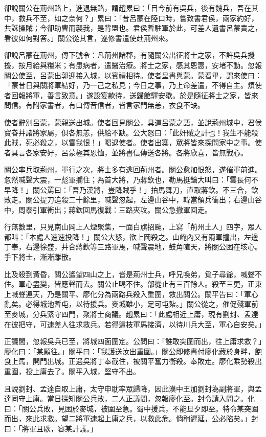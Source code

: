 卻說關公在荊州路上，進退無路，謂趙累曰：「目今前有吳兵，後有魏兵，吾在其中，救兵不至，如之奈何？」累曰：「昔呂蒙在陸口時，嘗致書君侯，兩家約好，共誅操賊；今卻助曹而襲我，是背盟也。君侯暫駐軍於此，可差人遺書呂蒙責之，看彼如何對答。」關公從其言，遂修書遣使赴荊州來。

卻說呂蒙在荊州，傳下號令：凡荊州諸郡，有隨關公出征將士之家，不許吳兵攪擾，按月給與糧米；有患病者，遣醫治療。將士之家，感其恩惠，安堵不動。忽報關公使至，呂蒙出郭迎接入城，以賓禮相待。使者呈書與蒙。蒙看畢，謂來使曰：「蒙昔日與關將軍結好，乃一己之私見；今日之事，乃上命差遣，不得自主。煩使者回報將軍，善言致意。」遂設宴款待，送歸館驛安歇。於是隨征將士之家，皆來問信。有附家書者，有口傳音信者，皆言家門無恙，衣食不缺。

使者辭別呂蒙，蒙親送出城。使者回見關公，具道呂蒙之語，並說荊州城中，君侯寶眷并諸將家屬，俱各無恙，供給不缺。公大怒曰：「此奸賊之計也！我生不能殺此賊，死必殺之，以雪我恨！」喝退使者。使者出寨，眾將皆來探問家中之事。使者具言各家安好，呂蒙極其恩恤，並將書信傳送各將。各將欣喜，皆無戰心。

關公率兵取荊州，軍行之次，將士多有逃回荊州者。關公愈加恨怒，遂催軍前進。忽然喊聲大震，一彪軍攔住；為首大將，乃蔣欽也，勒馬挺鎗大叫曰：「雲長何不早降！」關公罵曰：「吾乃漢將，豈降賊乎！」拍馬舞刀，直取蔣欽。不三合，欽敗走。關公提刀追殺二十餘里，喊聲忽起，左邊山谷中，韓當領兵衝出；右邊山谷中，周泰引軍衝出；蔣欽回馬復戰：三路夾攻。關公急撤軍回走。

行無數里，只見南山岡上人煙聚集，一面白旗招颭，上寫「荊州土人」四字，眾人都叫：「本處人速速投降！」關公大怒，欲上岡殺之。山崦內又有兩軍撞出，左邊丁奉，右邊徐盛，并合蔣欽等三路軍馬，喊聲震地，鼓角喧天，將關公困在垓心。手下將士，漸漸離散。

比及殺到黃昏，關公遙望四山之上，皆是荊州士兵，呼兄喚弟，覓子尋爺，喊聲不住。軍心盡變，皆應聲而去。關公止喝不住。部從止有三百餘人。殺至三更，正東上喊聲連天，乃是關平、廖化分為兩路兵殺入重圍，救出關公。關平告曰：「軍心亂矣。必得城池暫屯，以待援兵。麥城雖小，足可屯紮。」關公從之，催促殘軍前至麥城，分兵緊守四門，聚將士商議。趙累曰：「此處相近上庸，現有劉封、孟達在彼把守，可速差人往求救兵。若得這枝軍馬接濟，以待川兵大至，軍心自安矣。」

正議間，忽報吳兵已至，將城四面圍定。公問曰：「誰敢突圍而出，往上庸求救？」廖化曰：「某願往。」關平曰：「我護送汝出重圍。」關公即修書付廖化藏於身畔，飽食上馬，開門出城。正遇吳將丁奉截住，被關平奮力衝殺。奉敗走。廖化乘勢殺出重圍，投上庸去了。關平入城，堅守不出。

且說劉封、孟達自取上庸，太守申耽率眾歸降，因此漢中王加劉封為副將軍，與孟達同守上庸。當日探知關公兵敗，二人正議間，忽報廖化至。封令請入問之。化曰：「關公兵敗，見困於麥城，被圍至急。蜀中援兵，不能旦夕即至。特令某突圍而出，來此求救。望二將軍速起上庸之兵，以救此危。倘稍遲延，公必陷矣。」封曰：「將軍且歇，容某計議。」

